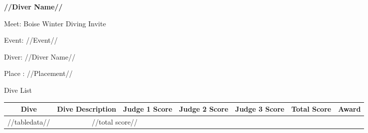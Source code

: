\documentclass[12pt, letterpaper, landscape]{article}
\begin{document}
	\begin{center}
		\textbf{//Diver Name//}
	\end{center}
	
	Meet: Boise Winter Diving Invite

	Event: //Event//
	
	Diver: //Diver Name//
	
	Place : //Placement//
	
	\begin{center}
		Dive List
	\end{center}
	
	\begin{table}[h]
		\centering
			\begin{tabularx}{\textwidth}{|c X X X X X X|}
			Dive&Dive Description&Judge 1 Score&Judge 2 Score&Judge 3 Score&Total Score & Award\\\midrule
			//tabledata//\midrule
			\multicolumn{5}{|c}{Total} & \multicolumn{2}{c|}{//total score//}\\
		\end{tabularx}
	\end{table}
\end{document}
